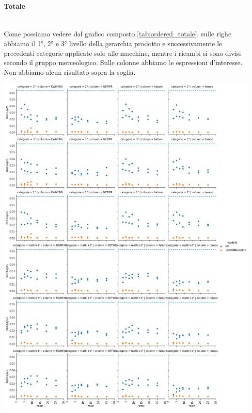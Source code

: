 \paragraph{Totale}\mbox{} \\
Come possiamo vedere dal grafico composto \ref{tab:ordered_totale}, sulle righe abbiamo il 1°, 2° e 3° livello della gerarchia prodotto e successivamente le precedenti categorie applicate solo alle macchine, mentre i ricambi si sono divisi secondo il gruppo merceologico. Sulle colonne abbiamo le espressioni d'interesse. Non abbiamo alcun risultato sopra la soglia.
\begin{center}
\includegraphics[width=14.5cm]{figures/risultati_ordered_categoria_totale.png}
\label{tab:ordered_totale}
\end{center}

